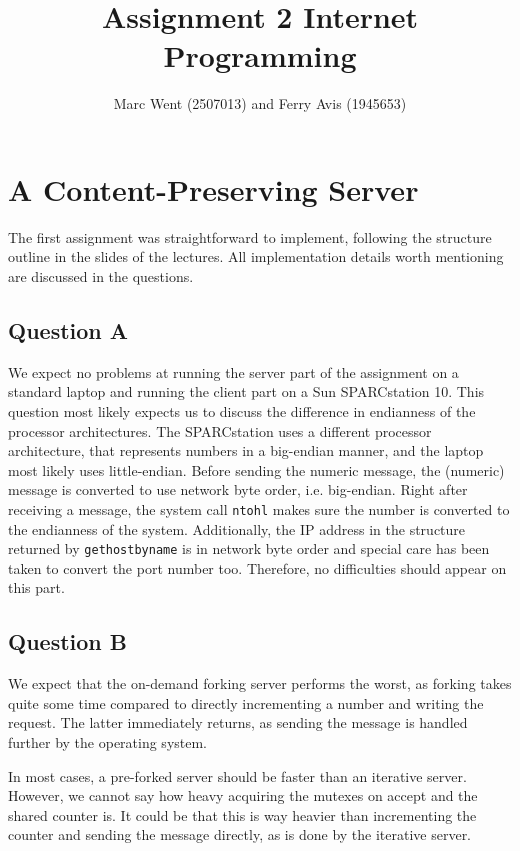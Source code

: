 \documentclass[11pt]{article}
\title{Assignment 2 Internet Programming}
\author{Marc Went (2507013) and Ferry Avis (1945653)}
\begin{document}
\maketitle

\section{A Content-Preserving Server}

The first assignment was straightforward to implement, following the structure outline in the slides of the lectures. All implementation details worth mentioning are discussed in the questions.

\subsection{Question A}

We expect no problems at running the server part of the assignment on a standard laptop and running the client part on a Sun SPARCstation 10. This question most likely expects us to discuss the difference in endianness of the processor architectures. The SPARCstation uses a different processor architecture, that represents numbers in a big-endian manner, and the laptop most likely uses little-endian. Before sending the numeric message, the (numeric) message is converted to use network byte order, i.e. big-endian. Right after receiving a message, the system call \texttt{ntohl} makes sure the number is converted to the endianness of the system. Additionally, the IP address in the structure returned by \texttt{gethostbyname} is in network byte order and special care has been taken to convert the port number too. Therefore, no difficulties should appear on this part.

\subsection{Question B}

We expect that the on-demand forking server performs the worst, as forking takes quite some time compared to directly incrementing a number and writing the request. The latter immediately returns, as sending the message is handled further by the operating system.

In most cases, a pre-forked server should be faster than an iterative server. However, we cannot say how heavy acquiring the mutexes on accept and the shared counter is. It could be that this is way heavier than incrementing the counter and sending the message directly, as is done by the iterative server.
\end{document}
